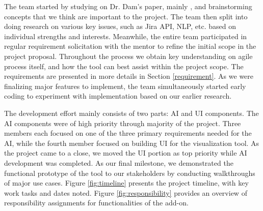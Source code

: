 The team started by studying on Dr. Dam's paper, mainly \cite{dam1}, and brainstorming concepts that we think are important to the project. The team then split into doing research on various key issues, such as Jira API, NLP, etc. based on individual strengths and interests. Meanwhile, the entire team participated in regular requirement solicitation with the mentor to refine the initial scope in the project proposal. Throughout the process we obtain key understanding on agile process itself, and how the tool can best assist within the project scope. The requirements are presented in more details in Section \ref{requirement}. As we were finalizing major features to implement, the team simultaneously started early coding to experiment with implementation based on our earlier research. 

The development effort mainly consists of two parts: AI and UI components.  The AI components were of high priority through majority of the project. Three members each focused on one of the three primary requirements needed for the AI, while the fourth member focused on building UI for the visualization tool. As the project came to a close, we moved the UI portion as top priority while AI development was completed. As our final milestone, we demonstrated the functional prototype of the tool to our stakeholders by conducting walkthroughs of major use cases. Figure \ref{fig:timeline} presents the project timeline, with key work tasks and dates noted. Figure \ref{fig:responsibility} provides an overview of responsibility assignments for functionalities of the add-on.

